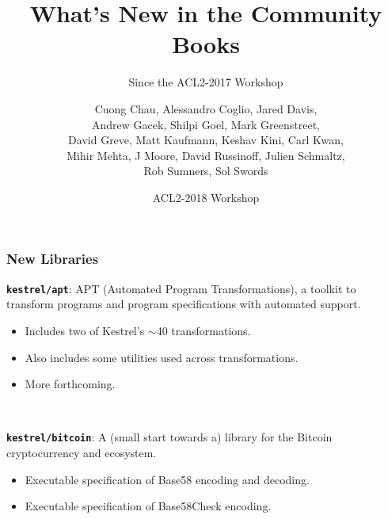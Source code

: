 \documentclass{beamer}
\newcommand{\code}[1]{\texttt{#1}}
\newcommand{\bookpath}[1]{\textbf{\code{#1}}}
\newcommand{\newlibtitle}{\frametitle{New Libraries}}
\begin{document}

\title{What's New in the Community Books}

\subtitle{Since the ACL2-2017 Workshop}

\author{Cuong Chau,
        Alessandro Coglio,
        Jared Davis,
        \\
        Andrew Gacek,
        Shilpi Goel,
        Mark Greenstreet,
        \\
        David Greve,
        Matt Kaufmann,
        Keshav Kini,
        Carl Kwan,
        \\
        Mihir Mehta,
        J Moore,
        David Russinoff,
        Julien Schmaltz,
        \\
        Rob Sumners,
        Sol Swords}


\date{ACL2-2018 Workshop}



\begin{frame}

\newlibtitle

\bookpath{kestrel/apt}:
APT (Automated Program Transformations),
a toolkit
to transform programs and program specifications with automated support.
\begin{itemize}
\item
Includes two of Kestrel's $\sim$40 transformations.
\item
Also includes some utilities used across transformations.
\item
More forthcoming.
\end{itemize}

\

\bookpath{kestrel/bitcoin}:
A (small start towards a) library for the Bitcoin cryptocurrency and ecosystem.
\begin{itemize}
\item
Executable specification of Base58 encoding and decoding.
\item
Executable specification of Base58Check encoding.
\end{itemize}

\end{frame}
\end{document}
